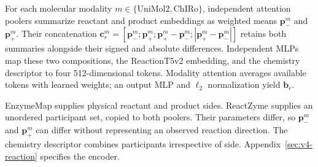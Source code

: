 For each molecular modality $m\in\{\mathrm{UniMol2},\mathrm{ChIRo}\}$,
independent attention poolers summarize reactant and product embeddings as
weighted means $\mathbf{p}_-^m$ and $\mathbf{p}_+^m$. Their concatenation
$\mathbf{c}_r^m=[\mathbf{p}_-^m;\mathbf{p}_+^m;\mathbf{p}_+^m-\mathbf{p}_-^m;|\mathbf{p}_+^m-\mathbf{p}_-^m|]$ retains both summaries
alongside their signed and absolute differences. Independent MLPs map these
two compositions, the ReactionT5v2 embedding, and the chemistry descriptor
to four 512-dimensional tokens. Modality attention averages available tokens
with learned weights; an output MLP and $\ell_2$ normalization yield $\mathbf{b}_r$.

EnzymeMap supplies physical reactant and product sides. ReactZyme supplies
an unordered participant set, copied to both poolers. Their parameters
differ, so $\mathbf{p}_-^m$ and $\mathbf{p}_+^m$ can differ without representing an observed
reaction direction. The chemistry descriptor combines participants
irrespective of side. Appendix~\ref{sec:v4-reaction} specifies the encoder.


